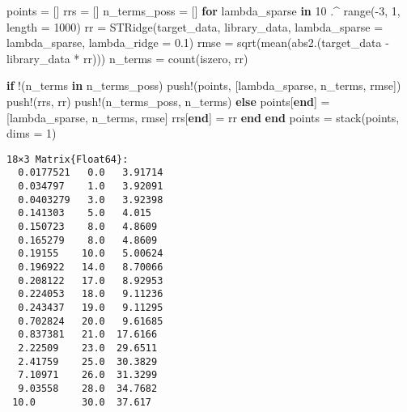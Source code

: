 \documentclass[
]{article}
\newenvironment{Shaded}{\begin{snugshade}}{\end{snugshade}}
\newcommand{\ControlFlowTok}[1]{\textcolor[rgb]{0.00,0.23,0.31}{\textbf{#1}}}
\newcommand{\FloatTok}[1]{\textcolor[rgb]{0.68,0.00,0.00}{#1}}
\newcommand{\FunctionTok}[1]{\textcolor[rgb]{0.28,0.35,0.67}{#1}}
\newcommand{\KeywordTok}[1]{\textcolor[rgb]{0.00,0.23,0.31}{\textbf{#1}}}
\newcommand{\NormalTok}[1]{\textcolor[rgb]{0.00,0.23,0.31}{#1}}
\newcommand{\OperatorTok}[1]{\textcolor[rgb]{0.37,0.37,0.37}{#1}}
\begin{document}
\begin{Shaded}
\begin{Highlighting}[]
\NormalTok{points }\OperatorTok{=}\NormalTok{ []}
\NormalTok{rrs }\OperatorTok{=}\NormalTok{ []}
\NormalTok{n\_terms\_poss }\OperatorTok{=}\NormalTok{ []}
\ControlFlowTok{for}\NormalTok{ lambda\_sparse }\KeywordTok{in} \FloatTok{10} \OperatorTok{.\^{}} \FunctionTok{range}\NormalTok{(}\OperatorTok{{-}}\FloatTok{3}\NormalTok{, }\FloatTok{1}\NormalTok{, length }\OperatorTok{=} \FloatTok{1000}\NormalTok{)}
\NormalTok{  rr }\OperatorTok{=} \FunctionTok{STRidge}\NormalTok{(target\_data, library\_data, lambda\_sparse }\OperatorTok{=}\NormalTok{ lambda\_sparse, lambda\_ridge }\OperatorTok{=} \FloatTok{0.1}\NormalTok{)}
\NormalTok{  rmse }\OperatorTok{=} \FunctionTok{sqrt}\NormalTok{(}\FunctionTok{mean}\NormalTok{(}\FunctionTok{abs2}\NormalTok{.(target\_data }\OperatorTok{{-}}\NormalTok{ library\_data }\OperatorTok{*}\NormalTok{ rr)))}
\NormalTok{  n\_terms }\OperatorTok{=} \FunctionTok{count}\NormalTok{(iszero, rr)}

  \ControlFlowTok{if}\NormalTok{ !(n\_terms }\KeywordTok{in}\NormalTok{ n\_terms\_poss)}
    \FunctionTok{push!}\NormalTok{(points, [lambda\_sparse, n\_terms, rmse])}
    \FunctionTok{push!}\NormalTok{(rrs, rr)}
    \FunctionTok{push!}\NormalTok{(n\_terms\_poss, n\_terms)}
  \ControlFlowTok{else}
\NormalTok{    points[}\KeywordTok{end}\NormalTok{] }\OperatorTok{=}\NormalTok{ [lambda\_sparse, n\_terms, rmse]}
\NormalTok{    rrs[}\KeywordTok{end}\NormalTok{] }\OperatorTok{=}\NormalTok{ rr}
  \ControlFlowTok{end}
\ControlFlowTok{end}
\NormalTok{points }\OperatorTok{=} \FunctionTok{stack}\NormalTok{(points, dims }\OperatorTok{=} \FloatTok{1}\NormalTok{)}
\end{Highlighting}
\end{Shaded}

\begin{verbatim}
18×3 Matrix{Float64}:
  0.0177521   0.0   3.91714
  0.034797    1.0   3.92091
  0.0403279   3.0   3.92398
  0.141303    5.0   4.015
  0.150723    8.0   4.8609
  0.165279    8.0   4.8609
  0.19155    10.0   5.00624
  0.196922   14.0   8.70066
  0.208122   17.0   8.92953
  0.224053   18.0   9.11236
  0.243437   19.0   9.11295
  0.702824   20.0   9.61685
  0.837381   21.0  17.6166
  2.22509    23.0  29.6511
  2.41759    25.0  30.3829
  7.10971    26.0  31.3299
  9.03558    28.0  34.7682
 10.0        30.0  37.617
\end{verbatim}
\end{document}
